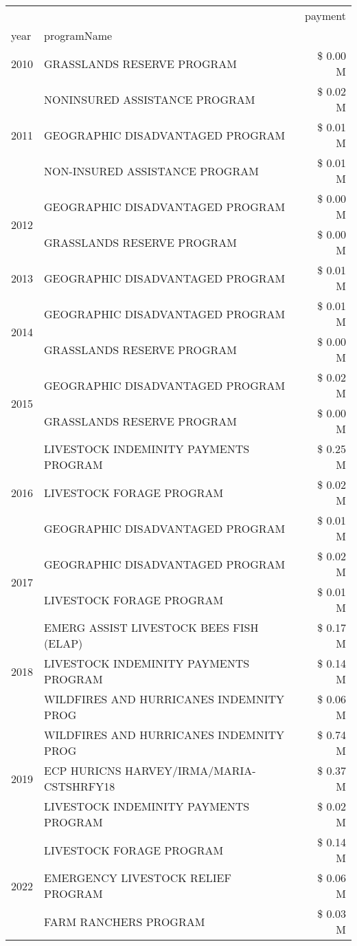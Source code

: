 \begin{tabular}{llr}
\toprule
 &  & payment \\
year & programName &  \\
\midrule
2010 & GRASSLANDS RESERVE PROGRAM & \$ 0.00 M \\
\cline{1-3}
\multirow[t]{3}{*}{2011} & NONINSURED ASSISTANCE PROGRAM & \$ 0.02 M \\
 & GEOGRAPHIC DISADVANTAGED PROGRAM & \$ 0.01 M \\
 & NON-INSURED ASSISTANCE PROGRAM & \$ 0.01 M \\
\cline{1-3}
\multirow[t]{2}{*}{2012} & GEOGRAPHIC DISADVANTAGED PROGRAM & \$ 0.00 M \\
 & GRASSLANDS RESERVE PROGRAM & \$ 0.00 M \\
\cline{1-3}
2013 & GEOGRAPHIC DISADVANTAGED PROGRAM & \$ 0.01 M \\
\cline{1-3}
\multirow[t]{2}{*}{2014} & GEOGRAPHIC DISADVANTAGED PROGRAM & \$ 0.01 M \\
 & GRASSLANDS RESERVE PROGRAM & \$ 0.00 M \\
\cline{1-3}
\multirow[t]{2}{*}{2015} & GEOGRAPHIC DISADVANTAGED PROGRAM & \$ 0.02 M \\
 & GRASSLANDS RESERVE PROGRAM & \$ 0.00 M \\
\cline{1-3}
\multirow[t]{3}{*}{2016} & LIVESTOCK INDEMINITY PAYMENTS PROGRAM & \$ 0.25 M \\
 & LIVESTOCK FORAGE PROGRAM & \$ 0.02 M \\
 & GEOGRAPHIC DISADVANTAGED PROGRAM & \$ 0.01 M \\
\cline{1-3}
\multirow[t]{2}{*}{2017} & GEOGRAPHIC DISADVANTAGED PROGRAM & \$ 0.02 M \\
 & LIVESTOCK FORAGE PROGRAM & \$ 0.01 M \\
\cline{1-3}
\multirow[t]{3}{*}{2018} & EMERG ASSIST LIVESTOCK BEES FISH (ELAP) & \$ 0.17 M \\
 & LIVESTOCK INDEMINITY PAYMENTS PROGRAM & \$ 0.14 M \\
 & WILDFIRES AND HURRICANES INDEMNITY PROG & \$ 0.06 M \\
\cline{1-3}
\multirow[t]{3}{*}{2019} & WILDFIRES AND HURRICANES INDEMNITY PROG & \$ 0.74 M \\
 & ECP HURICNS HARVEY/IRMA/MARIA-CSTSHRFY18 & \$ 0.37 M \\
 & LIVESTOCK INDEMINITY PAYMENTS PROGRAM & \$ 0.02 M \\
\cline{1-3}
\multirow[t]{3}{*}{2022} & LIVESTOCK FORAGE PROGRAM & \$ 0.14 M \\
 & EMERGENCY LIVESTOCK RELIEF PROGRAM & \$ 0.06 M \\
 & FARM RANCHERS PROGRAM & \$ 0.03 M \\
\cline{1-3}
\bottomrule
\end{tabular}
